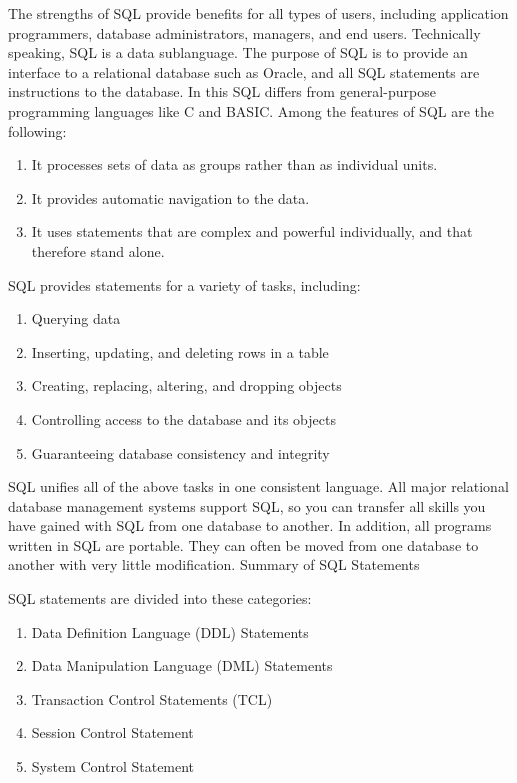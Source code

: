 The strengths of SQL provide benefits for all types of users, including application programmers, database administrators, managers, and end users. Technically speaking, SQL is a data sublanguage. The purpose of SQL is to provide an interface to a relational database such as Oracle, and all SQL statements are instructions to the database. In this SQL differs from general-purpose programming languages like C and BASIC. Among the features of SQL are the following:
\begin{enumerate}
\item It processes sets of data as groups rather than as individual units.
\item It provides automatic navigation to the data.
\item It uses statements that are complex and powerful individually, and that therefore stand alone.
\end{enumerate}

SQL provides statements for a variety of tasks, including:
\begin{enumerate}
\item Querying data
\item Inserting, updating, and deleting rows in a table
\item Creating, replacing, altering, and dropping objects
\item Controlling access to the database and its objects
\item Guaranteeing database consistency and integrity
\end{enumerate}

SQL unifies all of the above tasks in one consistent language. All major relational database management systems support SQL, so you can transfer all skills you have gained with SQL from one database to another. In addition, all programs written in SQL are portable. They can often be moved from one database to another with very little modification. Summary of SQL Statements

SQL statements are divided into these categories:
\begin{enumerate}
\item Data Definition Language (DDL) Statements
\item Data Manipulation Language (DML) Statements
\item Transaction Control Statements (TCL)
\item Session Control Statement
\item System Control Statement
\end{enumerate}

